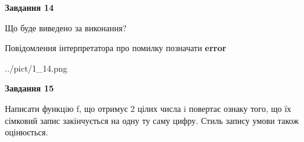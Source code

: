 \documentclass[11pt, ukrainian]{article}
\begin{document}
{\begin {large}
{\begin {center}\textbf{Завдання 14}\end {center}}\par
Що буде виведено за виконання? \par
Повідомлення інтерпретатора про помилку позначати \textbf{error}

\begin{center}
	{../pict/1_14.png}
\end{center}
\newpage

{\begin {center}\textbf{Завдання 15}\end {center}}\par

Написати функцiю f, що отримує 2 цілих числа i повертає ознаку того, що їх сімковий запис закінчується на одну ту саму цифру. Стиль запису умови також оцінюється.\par
\newpage

\end {large}}
\end{document}
